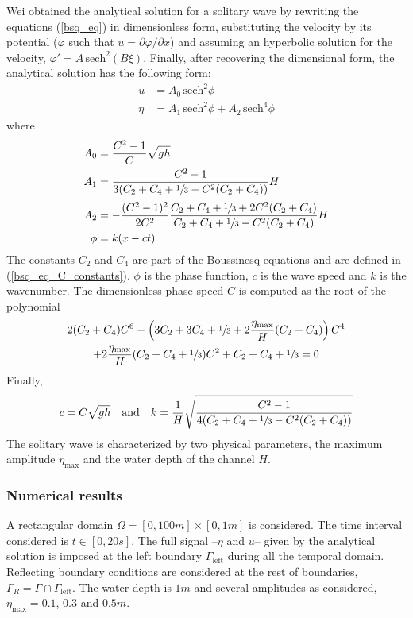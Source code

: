 Wei obtained the analytical solution for a solitary wave by rewriting the equations (\ref{bsq_eq}) in dimensionless form, substituting the velocity by its potential ($\varphi$ such that $u = \partial \varphi / \partial x$) and assuming an hyperbolic solution for the velocity, $\varphi' = A\,\text{sech}^2(B\xi)$. Finally, after recovering the dimensional form, the analytical solution has the following form:
\begin{align}
    u    &= A_0 \, \text{sech}^2 \phi \\
    \eta &= A_1 \, \text{sech}^2 \phi + A_2 \, \text{sech}^4 \phi
\end{align}
where
\begin{equation}
\begin{split}
    A_0 &= \frac{C^2-1}{C}\sqrt{gh} \\
    A_1 &= \frac{C^2-1}{3(C_2 + C_4 + \sfrac{1}{3} - C^2 (C_2 + C_4))} H \\[2pt]
    A_2 &= -\frac{(C^2-1)^2}{2C^2}\frac{C_2 + C_4 + \sfrac{1}{3} + 2C^2(C_2 + C_4)}{C_2 + C_4 + \sfrac{1}{3} - C^2(C_2 + C_4)} H \\
    \phi &= k (x - ct)
\end{split}
\end{equation}
The constants $C_2$ and $C_4$ are part of the Boussinesq equations and are defined in (\ref{bsq_eq_C_constants}). $\phi$ is the phase function, $c$ is the wave speed and $k$ is the wavenumber. The dimensionless phase speed $C$ is computed as the root of the polynomial
\begin{multline*}
    2(C_2 + C_4) C^6
    -\left(3C_2 + 3C_4 + \sfrac{1}{3} + 2\frac{\eta_{\text{max}}}{H}(C_2 + C_4)\right) C^4 \\
    +2\frac{\eta_{\text{max}}}{H} (C_2 + C_4 + \sfrac{1}{3}) C^2
    +C_2 + C_4 + \sfrac{1}{3} = 0
\end{multline*}
Finally,
\begin{equation*}
    c = C\sqrt{gh} \quad \text{and} \quad
    k = \frac{1}{H}\sqrt{\frac{C^2 - 1}{4(C_2 + C_4 + \sfrac{1}{3} - C^2(C_2 + C_4))}}
\end{equation*}
The solitary wave is characterized by two physical parameters, the maximum amplitude $\eta_\text{max}$ and the water depth of the channel $H$.


\subsubsection{Numerical results}


A rectangular domain $\Omega = [0,100m] \times [0,1m]$ is considered. The time interval considered is $t\in[0,20s]$. The full signal --$\eta$ and $u$-- given by the analytical solution is imposed at the left boundary $\Gamma_\text{left}$ during all the temporal domain. Reflecting boundary conditions are considered at the rest of boundaries, $\Gamma_R = \Gamma \cap \Gamma_\text{left}$. The water depth is $1m$ and several amplitudes as considered, $\eta_\text{max}=0.1$, $0.3$ and $0.5m$.


